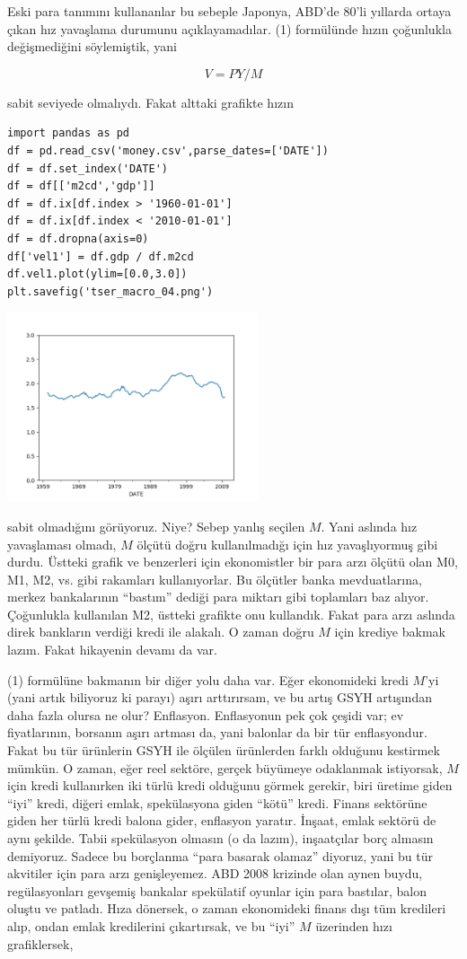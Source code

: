 \documentclass[12pt,fleqn]{article}\usepackage{../../common}
\begin{document}
Eski para tanımını kullananlar bu sebeple Japonya, ABD'de 80'li yıllarda
ortaya çıkan hız yavaşlama durumunu açıklayamadılar. (1) formülünde hızın
çoğunlukla değişmediğini söylemiştik, yani 

$$ V = PY / M$$

sabit seviyede olmalıydı. Fakat alttaki grafikte hızın

\begin{verbatim}
import pandas as pd
df = pd.read_csv('money.csv',parse_dates=['DATE'])
df = df.set_index('DATE')
df = df[['m2cd','gdp']]
df = df.ix[df.index > '1960-01-01']
df = df.ix[df.index < '2010-01-01']
df = df.dropna(axis=0)
df['vel1'] = df.gdp / df.m2cd
df.vel1.plot(ylim=[0.0,3.0])
plt.savefig('tser_macro_04.png')
\end{verbatim}

\includegraphics[width=20em]{tser_macro_04.png}

sabit olmadığını görüyoruz. Niye? Sebep yanlış seçilen $M$. Yani aslında
hız yavaşlaması olmadı, $M$ ölçütü doğru kullanılmadığı için hız
yavaşlıyormuş gibi durdu. Üstteki grafik ve benzerleri için ekonomistler
bir para arzı ölçütü olan M0, M1, M2, vs. gibi rakamları kullanıyorlar. Bu
ölçütler banka mevduatlarına, merkez bankalarının ``bastım'' dediği para
miktarı gibi toplamları baz alıyor. Çoğunlukla kullanılan M2, üstteki
grafikte onu kullandık. Fakat para arzı aslında direk bankların verdiği
kredi ile alakalı. O zaman doğru $M$ için krediye bakmak lazım. Fakat
hikayenin devamı da var.

(1) formülüne bakmanın bir diğer yolu daha var. Eğer ekonomideki kredi
$M$'yi (yani artık biliyoruz ki parayı) aşırı arttırırsam, ve bu artış GSYH
artışından daha fazla olursa ne olur?  Enflasyon. Enflasyonun pek çok
çeşidi var; ev fiyatlarının, borsanın aşırı artması da, yani balonlar da
bir tür enflasyondur. Fakat bu tür ürünlerin GSYH ile ölçülen ürünlerden
farklı olduğunu kestirmek mümkün. O zaman, eğer reel sektöre, gerçek
büyümeye odaklanmak istiyorsak, $M$ için kredi kullanırken iki türlü kredi
olduğunu görmek gerekir, biri üretime giden ``iyi'' kredi, diğeri emlak,
spekülasyona giden ``kötü'' kredi. Finans sektörüne giden her türlü kredi
balona gider, enflasyon yaratır. İnşaat, emlak sektörü de aynı
şekilde. Tabii spekülasyon olmasın (o da lazım), inşaatçılar borç almasın
demiyoruz. Sadece bu borçlanma ``para basarak olamaz'' diyoruz, yani bu tür
akvitiler için para arzı genişleyemez. ABD 2008 krizinde olan aynen buydu,
regülasyonları gevşemiş bankalar spekülatif oyunlar için para bastılar,
balon oluştu ve patladı. Hıza dönersek, o zaman ekonomideki finans dışı tüm
kredileri alıp, ondan emlak kredilerini çıkartırsak, ve bu ``iyi'' $M$
üzerinden hızı grafiklersek,
\end{document}
